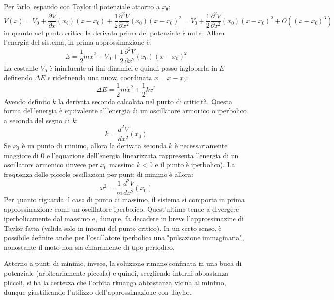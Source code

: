 \documentclass[a4paper,openany]{article}
\begin{document}
	Per farlo, espando con Taylor il potenziale attorno a $x_0$:
	$$
	V(x) = V_{0} + \dfrac{\partial V}{\partial x}(x_0) (x-x_0) + \dfrac{1}{2}\dfrac{\partial^2 V}{\partial x^2 }(x_0)(x-x_0)^2 = V_{0} + \dfrac{1}{2}\dfrac{\partial^2 V}{\partial x^2 }(x_0)(x-x_0)^2 + O((x-x_0)^3)
	$$
	in quanto nel punto critico la derivata prima del potenziale è nulla. Allora l'energia del sistema, in prima approssimazione è:
	$$
	E = \dfrac{1}{2}m\dot{x}^2 + V_{0} + \dfrac{1}{2}\dfrac{\partial^2 V}{\partial x^2 }(x_0)(x-x_0)^2 
	$$
	La costante $V_0$ è ininfluente ai fini dinamici e quindi posso inglobarla in $E$ definendo $\Delta E$ e ridefinendo una nuova coordinata $x = x-x_0$:
	$$
	\Delta E = \dfrac{1}{2}m\dot{x}^2 + \dfrac{1}{2}kx^2
	$$
	Avendo definito $k$ la derivata seconda calcolata nel punto di criticità. Questa forma dell'energia è equivalente all'energia di un oscillatore armonico o iperbolico a seconda del segno di $k$:
	$$
	k = \dfrac{d^2 V}{dx^2}(x_0)
	$$
	Se $x_0$ è un punto di minimo, allora la derivata seconda $k$ è necessariamente maggiore di $0$ e l'equazione dell'energia linearizzata rappresenta l'energia di un oscillatore armonico (invece per $x_0$ massimo $k<0$ e il punto è iperbolico). La frequenza delle piccole oscillazioni per punti di minimo è allora:
	$$
	\omega^2 = \dfrac{1}{m}\dfrac{d^2 V}{dx^2}(x_0)
	$$
	Per quanto riguarda il caso di punto di massimo, il sistema si comporta in prima approssimazione come un oscillatore iperbolico. Quest'ultimo tende a divergere iperbolicamente dal massimo e, dunque, fa decadere in breve l'approssimazine di Taylor fatta (valida solo in intorni del punto critico). In un certo senso, è possibile definire anche per l'oscillatore iperbolico una "pulsazione immaginaria", nonostante il moto non sia chiaramente di tipo periodico.
	
	Attorno a punti di minimo, invece, la soluzione rimane confinata in una buca di potenziale (arbitrariamente piccola) e quindi, scegliendo intorni abbastanza piccoli, si ha la certezza che l'orbita rimanga abbastanza vicina al minimo, dunque giustificando l'utilizzo dell'approssimazione con Taylor.
\end{document}
